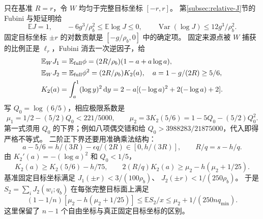 \documentclass[UTF8,a4paper,11pt,fontset=fandol]{ctexart}
\theoremstyle{remark}
\newcommand{\dint}{\,\mathrm d}
\begin{document}
只在基准 $R=r$，令 $W$ 均匀于完整目标坐标 $[-r,r]$。
第\ref{subsec:relative-J}节的 Fubini 与矩证明给
\begin{equation}\label{eq:cantelli-loglaw}
 \mathbb EJ=1,\qquad
 -6g^3/\rho_b^2\le\mathbb E\log J\le0,\qquad
 \operatorname{Var}(\log J)\le12g^3/\rho_b^2.
\end{equation}
固定目标坐标 $\pm r$ 的对数贡献是 $[-g/\rho_b,0]$ 中的确定项。
固定来源点被 $W$ 捕获的比例正是 $\ell_r$，Fubini 消去一次逆因子，给
\begin{equation}\label{eq:cantelli-Fubini}
\begin{aligned}
 \mathbb E_WJ_1&=\mathbb E_{\rm full}\phi
       =(2R/\rho_b)(1-a+a\log a),\\
 \mathbb E_WJ_2&=\mathbb E_{\rm full}\phi^2
       =(2R/\rho_b)K_2(a),\quad a=1-g/(2R)\ge5/6,\\
 K_2(a)&=\int_a^1(\log y)^2\dint y
       =2-a[(-\log a)^2+2(-\log a)+2].
\end{aligned}
\end{equation}
写 $Q_0=\log(6/5)$，相应极限系数是
\[
 \mu_1=1/2-(5/2)Q_0<221/5000,\qquad
 \mu_2=3K_2(5/6)=1-5Q_0-(5/2)Q_0^2.
\]
第一式须用 $Q_0$ 的下界；例如八项偶交错和给
$Q_0>3988283/21875000$，代入即得严格不等式。
二阶正下界还要用准确乘法结构：
\[
 a-5/6=h/(3R)-\epsilon q/(2R)\in[0,h/(3R)],\qquad
 R/q=s-h/q.
\]
由 $K_2'(a)=-(\log a)^2$ 和 $Q_0<1/5$，
\[
 K_2(a)\ge K_2(5/6)-h/75,\qquad
 2(R/q)K_2(a)\ge\mu_2-h(\mu_2+1/25).
\]
基准固定目标坐标满足 $J_1(\pm r)<3/(100\rho_b)$、
$J_2(\pm r)<1/(250\rho_b)$。
于是 $S_2=\sum_iJ_2(w_i;q_b)$ 在每张完整目标面上满足
\begin{equation}\label{eq:cantelli-secondmean}
 (1-1/n)[\mu_2-h(\mu_2+1/25)]
 \le\mathbb ES_2/x\le\mu_2+1/(250nq_{\min}).
\end{equation}
这里保留了 $n-1$ 个自由坐标与真正固定目标坐标的区别。
\end{document}
